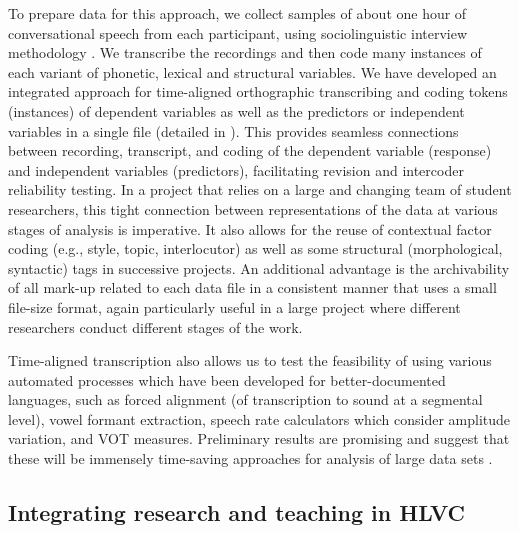 \documentclass[output=paper]{LSP/langsci}
\begin{document}
To prepare data for this approach, we collect samples of about one hour of conversational speech from each participant, using sociolinguistic interview methodology \citep{labov_field_1984}. We transcribe the recordings and then code many instances of each variant of phonetic, lexical and structural variables. We have developed an integrated approach for time-aligned orthographic transcribing and coding tokens (instances) of dependent variables as well as the predictors or independent variables in a single file (detailed in \citealt{nagy_extending_2015}). This provides seamless connections between recording, transcript, and coding of the dependent variable (response) and independent variables (predictors), facilitating revision and intercoder reliability testing. In a project that relies on a large and changing team of student researchers, this tight connection between representations of the data at various stages of analysis is imperative. It also allows for the reuse of contextual factor coding (e.g., style, topic, interlocutor) as well as some structural (morphological, syntactic) tags in successive projects. An additional advantage is the archivability of all mark-up related to each data file in a consistent manner that uses a small file-size format, again particularly useful in a large project where different researchers conduct different stages of the work. 

Time-aligned transcription also allows us to test the feasibility of using various automated processes which have been developed for better-documented languages, such as forced alignment (of transcription to sound at a segmental level), vowel formant extraction, speech rate calculators which consider amplitude variation, and VOT measures. Preliminary results are promising and suggest that these will be immensely time-saving approaches for analysis of large data sets \citep{tse_exploring_2014}.

\subsection{Integrating research and teaching in HLVC}
\end{document}
